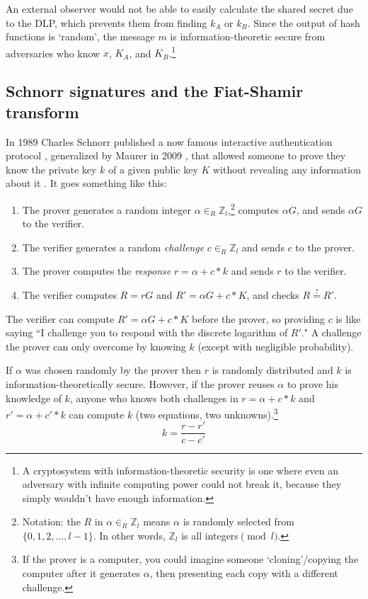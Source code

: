 An external observer would not be able to easily calculate the shared secret due to the DLP, which prevents them from finding $k_A$ or $k_B$. Since the output of hash functions is `random', the message $m$ is information-theoretic secure from adversaries who know $x$, $K_A$, and $K_B$.\footnote{\label{information_theoretic_note}A cryptosystem with information-theoretic security is one where even an adversary with infinite computing power could not break it, because they simply wouldn’t have enough information.}


\subsection{Schnorr signatures and the Fiat-Shamir transform}
\label{sec:schnorr-fiat-shamir}

In 1989 Charles Schnorr published a now famous interactive authentication protocol \cite{schnorr-signatures}, generalized by Maurer in 2009 \cite{simple-zk-proof-maurer}, that allowed someone to prove they know the private key $k$ of a given public key $K$ without revealing any information about it \cite{Signatures2015BorromeanRS}. It goes something like this:

\begin{enumerate}
	\item The prover generates a random integer \(\alpha \in_R \mathbb{Z}_l\),\footnote{\label{notation3_note}Notation: the $R$ in \(\alpha \in_R \mathbb{Z}_l\) means $\alpha$ is randomly selected from \(\{0,1,2,...,l-1\}\). In other words, $\mathbb{Z}_l$ is all integers$\pmod l$.} computes $\alpha G$, and sends $\alpha G$ to the verifier.
	\item The verifier generates a random {\em challenge} $c \in_R \mathbb{Z}_l$ and sends $c$ to the prover.
	\item The prover computes the {\em response} $r = \alpha + c*k$ and sends $r$ to the verifier.
	\item The verifier computes $R = r G$ and $R' = \alpha G + c*K$, and checks $R \stackrel{?}{=} R'$.
\end{enumerate}

The verifier can compute $R' = \alpha G + c*K$ before the prover, so providing $c$ is like saying ``I challenge you to respond with the discrete logarithm of $R'$." A challenge the prover can only overcome by knowing $k$ (except with negligible probability).

If $\alpha$ was chosen randomly by the prover then $r$ is randomly distributed \cite{SCOZZAFAVA1993313} and $k$ is information-theoretically secure. However, if the prover reuses $\alpha$ to prove his knowledge of $k$, anyone who knows both challenges in $r = \alpha + c*k$ and $r' = \alpha + c'*k$ can compute $k$ (two equations, two unknowns).\footnote{If the prover is a computer, you could imagine someone `cloning'/copying the computer after it generates $\alpha$, then presenting each copy with a different challenge.}%
\[ k = \frac{r-r'}{c-c'} \]

